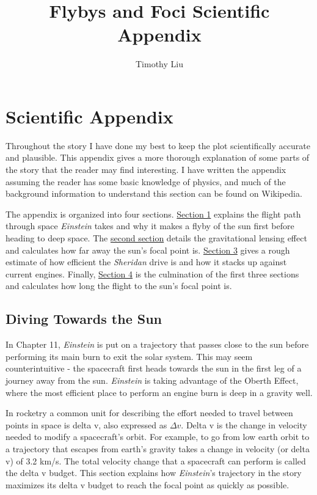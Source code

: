 \documentclass[12pt]{article} %
\title{Flybys and Foci Scientific Appendix}
\author{Timothy Liu}
\begin{document}
\maketitle
\tableofcontents

\section{Scientific Appendix}
Throughout the story I have done my best to keep the plot scientifically accurate and plausible. This appendix gives a more thorough explanation of some parts of the story that the reader may find interesting. I have written the appendix assuming the reader has some basic knowledge of physics, and much of the background information to understand this section can be found on Wikipedia.

The appendix is organized into four sections. \hyperref[subsec:diving]{Section 1} explains the flight path through space \textit{Einstein} takes and why it makes a flyby of the sun first before heading to deep space. The \hyperref[subsec:lensing]{second section} details the gravitational lensing effect and calculates how far away the sun's focal point is. \hyperref[subsec: efficiency]{Section 3} gives a rough estimate of how efficient the \textit{Sheridan} drive is and how it stacks up against current engines. Finally, \hyperref[subsec: flight time]{Section 4} is the culmination of the first three sections and calculates how long the flight to the sun's focal point is.

\subsection{Diving Towards the Sun}
\label{subsec:diving}

In Chapter 11, \textit{Einstein} is put on a trajectory that passes close to the sun before performing its main burn to exit the solar system. This may seem counterintuitive - the spacecraft first heads towards the sun in the first leg of a journey away from the sun. \textit{Einstein} is taking advantage of the Oberth Effect, where the most efficient place to perform an engine burn is deep in a gravity well.

In rocketry a common unit for describing the effort needed to travel between points in space is delta v, also expressed as $\Delta v$. Delta v is the change in velocity needed to modify a spacecraft's orbit. For example, to go from low earth orbit to a trajectory that escapes from earth's gravity takes a change in velocity (or delta v) of 3.2 km/s. The total velocity change that a spacecraft can perform is called the delta v budget. This section explains how \textit{Einstein}'s trajectory in the story maximizes its delta v budget to reach the focal point as quickly as possible.
\end{document}
